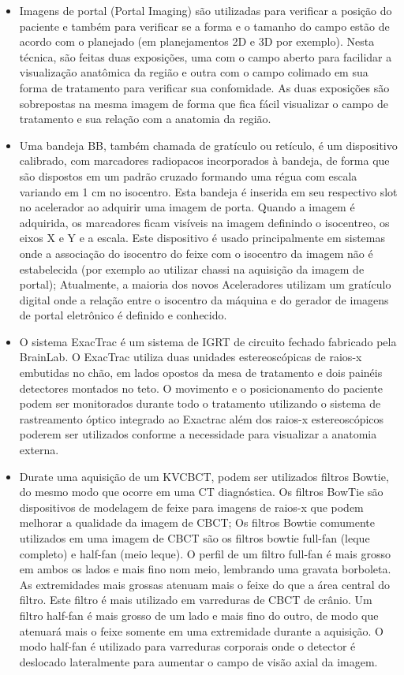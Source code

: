 \documentclass[11pt,a4paper]{article}
\newcounter{exemplo}
\begin{document}
\begin{exemplo}[IGRT]
\begin{itemize}
        \item Imagens de portal (Portal Imaging) são utilizadas para verificar a posição do paciente e também para verificar se a forma e o tamanho do campo estão de acordo com o planejado (em planejamentos 2D e 3D por exemplo). Nesta técnica, são feitas duas exposições, uma com o campo aberto para facilidar a visualização anatômica da região e outra com o campo colimado em sua forma de tratamento para verificar sua confomidade. As duas exposições são sobrepostas na mesma imagem de forma que fica fácil visualizar o campo de tratamento e sua relação com a anatomia da região.
        
        \item Uma bandeja BB, também chamada de gratículo ou retículo, é um dispositivo calibrado, com marcadores radiopacos incorporados à bandeja, de forma que são dispostos em um padrão cruzado formando uma régua com escala variando em 1 cm  no isocentro. Esta bandeja é inserida em seu respectivo slot no acelerador ao adquirir uma imagem de porta. Quando a imagem é adquirida, os marcadores ficam visíveis na imagem definindo o isocentreo, os eixos X e Y e a escala. Este dispositivo é usado principalmente em sistemas onde a associação do isocentro do feixe com o isocentro da imagem não é estabelecida (por exemplo ao utilizar chassi na aquisição da imagem de portal); Atualmente, a maioria dos novos Aceleradores utilizam um gratículo digital onde a relação entre o isocentro da máquina e do gerador de imagens de portal eletrônico é definido e conhecido.
        
        \item O sistema ExacTrac é um sistema de IGRT de circuito fechado fabricado pela BrainLab. O ExacTrac utiliza duas unidades estereoscópicas de raios-x embutidas no chão, em lados opostos da mesa de tratamento e dois painéis detectores montados no teto. O movimento e o posicionamento do paciente podem ser monitorados durante todo o tratamento utilizando o sistema de rastreamento óptico integrado ao Exactrac além dos raios-x estereoscópicos poderem ser utilizados conforme a necessidade para visualizar a anatomia externa.
        
        \item Durate uma aquisição de um KVCBCT, podem ser utilizados filtros Bowtie, do mesmo modo que ocorre em uma CT diagnóstica. Os filtros BowTie são dispositivos de modelagem de feixe para imagens de raios-x que podem melhorar a qualidade da imagem de CBCT; Os filtros Bowtie comumente utilizados em uma imagem de CBCT são os filtros bowtie full-fan (leque completo) e half-fan (meio leque). O perfil de um filtro full-fan é mais grosso em ambos os lados e mais fino nom meio, lembrando uma gravata borboleta. As extremidades mais grossas atenuam mais o feixe do que a área central do filtro. Este filtro é mais utilizado em varreduras de CBCT de crânio. Um filtro half-fan é mais grosso de um lado e mais fino do outro, de modo que atenuará mais o feixe somente em uma extremidade durante a aquisição. O modo half-fan é utilizado para varreduras corporais onde o detector é deslocado lateralmente para aumentar o campo de visão axial da imagem.
        

\end{itemize}
\end{exemplo}
\end{document}
